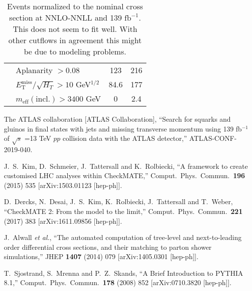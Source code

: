 \documentclass[10pt,fleqn]{article}
\newcommand{\ifb}{$\mathrm{fb}^{-1}$}
\newcommand{\met}{E^\mathrm{miss}_\mathrm{T}}
\newcommand{\meff}{m_\mathrm{eff}}
\begin{document}
\begin{table}[H]
\begin{tabular}{c|l|c|c}
             & Aplanarity $> 0.08$                             &     123    &   216          \\         
             & $\met/\sqrt{H_T} > 10$ GeV$^{1/2}$              &     84.6   &   177          \\    
             & $\meff(\mathrm{incl.}) > 3400$ GeV              &     0      &    2.4         \\ \bottomrule                 
\end{tabular}
\caption{Events normalized to the nominal cross section at NNLO-NNLL and 139 \ifb. This does not seem to fit well. With other cutflows in agreement this might be due to modeling problems. }
\end{table}   



\begin{thebibliography}{99}

  The ATLAS collaboration [ATLAS Collaboration],
  ``Search for squarks and gluinos in final states with jets and missing transverse momentum using 139 fb$^{-1}$ of $\sqrt{s}$ =13 TeV $pp$ collision data with the ATLAS detector,''
  ATLAS-CONF-2019-040.
  
  J.~S.~Kim, D.~Schmeier, J.~Tattersall and K.~Rolbiecki,
  ``A framework to create customised LHC analyses within CheckMATE,''
  Comput.\ Phys.\ Commun.\  {\bf 196} (2015) 535
  [arXiv:1503.01123 [hep-ph]].  
  
  D.~Dercks, N.~Desai, J.~S.~Kim, K.~Rolbiecki, J.~Tattersall and T.~Weber,
  ``CheckMATE 2: From the model to the limit,''
  Comput.\ Phys.\ Commun.\  {\bf 221} (2017) 383
  [arXiv:1611.09856 [hep-ph]].
 
 
  J.~Alwall {\it et al.},
  ``The automated computation of tree-level and next-to-leading order differential cross sections, and their matching to parton shower simulations,''
  JHEP {\bf 1407} (2014) 079
  [arXiv:1405.0301 [hep-ph]]. 
 
  T.~Sjostrand, S.~Mrenna and P.~Z.~Skands,
  ``A Brief Introduction to PYTHIA 8.1,''
  Comput.\ Phys.\ Commun.\  {\bf 178} (2008) 852
  [arXiv:0710.3820 [hep-ph]]. 

  
  
\end{thebibliography}
 
\end{document}
